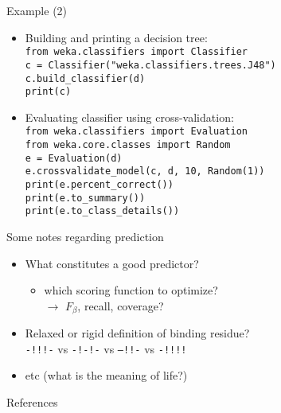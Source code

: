 \documentclass[pdf]
{beamer}
\begin{document}
\begin{frame}{Example (2)}
	\begin{itemize}
		\item Building and printing a decision tree:\\
			\texttt{from weka.classifiers import Classifier}\\
			\texttt{c = Classifier("weka.classifiers.trees.J48")}\\
			\texttt{c.build\_classifier(d)}\\
			\texttt{print(c)}
		\item Evaluating classifier using cross-validation:\\
			\texttt{from weka.classifiers import Evaluation}\\
			\texttt{from weka.core.classes import Random}\\
			\texttt{e = Evaluation(d)}\\
			\texttt{e.crossvalidate\_model(c, d, 10, Random(1))}\\
			\texttt{print(e.percent\_correct())}\\
			\texttt{print(e.to\_summary())}\\
			\texttt{print(e.to\_class\_details())}
	\end{itemize}
\end{frame}

\begin{frame}{Some notes regarding prediction}
	\begin{itemize}
		\item What constitutes a good predictor?\\
		\begin{itemize}
			\item which scoring function to optimize?\\
			$\rightarrow$ $F_\beta$, recall, coverage?
		\end{itemize}
		\item Relaxed or rigid definition of binding residue?\\
			\texttt{-!!!-} vs \texttt{-!-!-} vs \texttt{--!!-} vs \texttt{-!!!!}
		\item etc (what is the meaning of life?)
	\end{itemize}
\end{frame}


\begin{frame}{References}

\end{frame}
\end{document}

